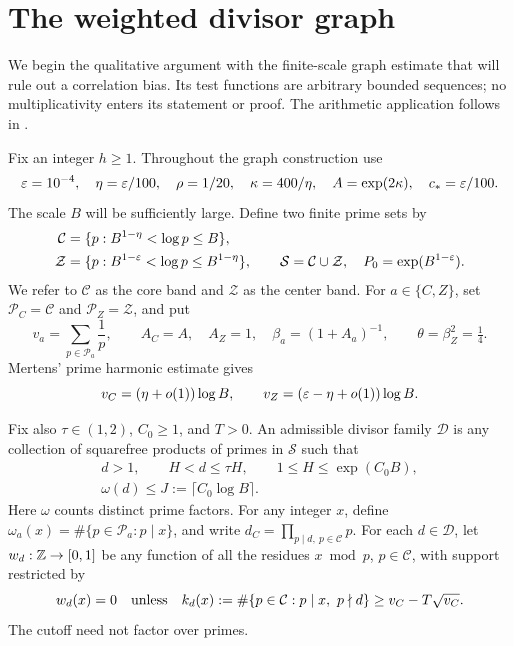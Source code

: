 \section{The weighted divisor graph}\label{sec:graph-setup}

We begin the qualitative argument with the finite-scale graph estimate
that will rule out a correlation bias. Its test functions are arbitrary bounded sequences;
no multiplicativity enters its statement or proof. The arithmetic
application follows in .

Fix an integer $h\ge1$. Throughout the graph construction use
\begin{equation}\label{eq:graph-constants}
 \varepsilon=10^{-4},\quad \eta=\varepsilon/100,\quad \rho=1/20,\quad
 \kappa=400/\eta,\quad A=\exp(2\kappa),\quad c_*=\varepsilon/100.
\end{equation}
The scale $B$ will be sufficiently large. Define two finite prime sets by
\begin{equation}\label{eq:prime-bands}
 \begin{split}
 \mathcal C&=\{p:B^{1-\eta}<\log p\le B\},\\
 \mathcal Z&=\{p:B^{1-\varepsilon}<\log p\le B^{1-\eta}\},\qquad
 \mathcal S=\mathcal C\cup\mathcal Z,\quad P_0=\exp(B^{1-\varepsilon}).
 \end{split}
\end{equation}
We refer to $\mathcal C$ as the core band and $\mathcal Z$ as the center
band. For $a\in\{C,Z\}$, set $\mathcal P_C=\mathcal C$ and
$\mathcal P_Z=\mathcal Z$, and put
\[
 v_a=\sum_{p\in\mathcal P_a}\frac1p,\qquad
 A_C=A,\quad A_Z=1,\quad \beta_a=(1+A_a)^{-1},\qquad
 \theta=\beta_Z^2=\tfrac14.
\]
Mertens' prime harmonic estimate gives
\[
 v_C=(\eta+o(1))\log B,\qquad
 v_Z=(\varepsilon-\eta+o(1))\log B.
\]

Fix also $\tau\in(1,2)$, $C_0\ge1$, and $T>0$. An admissible divisor
family $\mathcal D$ is any collection of squarefree products of primes
in $\mathcal S$ such that
\begin{equation}\label{eq:divisor-family}
 \begin{gathered}
 d>1,\qquad H<d\le\tau H,\qquad 1\le H\le\exp(C_0B),\\
 \omega(d)\le J:=\lceil C_0\log B\rceil.
 \end{gathered}
\end{equation}
Here $\omega$ counts distinct prime factors. For any integer $x$, define
$\omega_a(x)=\#\{p\in\mathcal P_a:p\mid x\}$, and write
$d_C=\prod_{p\mid d,\ p\in\mathcal C}p$.
For each $d\in\mathcal D$, let $w_d:\mathbb Z\to[0,1]$ be any function of
all the residues $x\bmod p$, $p\in\mathcal C$, with support restricted by
\begin{equation}\label{eq:core-cutoff}
 w_d(x)=0\quad\hbox{unless}\quad
 k_d(x):=\#\{p\in\mathcal C:p\mid x,\ p\nmid d\}
       \ge v_C-T\sqrt{v_C}.
\end{equation}
The cutoff need not factor over primes.

